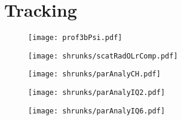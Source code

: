 \section{Tracking}
\begin{frame}
\begin{figure}
	\texttt{[image: prof3bPsi.pdf]}
\end{figure}
\end{frame}

\begin{frame}
\begin{figure}
	\centering
	\texttt{[image: shrunks/scatRadOLrComp.pdf]}
\end{figure}
\end{frame}




\begin{frame}
\begin{figure}
	\centering
	\texttt{[image: shrunks/parAnalyCH.pdf]}
\end{figure}
\end{frame}




\begin{frame}
\begin{figure}
	\centering
	\texttt{[image: shrunks/parAnalyIQ2.pdf]}
\end{figure}
\end{frame}



\begin{frame}
\begin{figure}
	\centering
	\texttt{[image: shrunks/parAnalyIQ6.pdf]}
\end{figure}
\end{frame}

